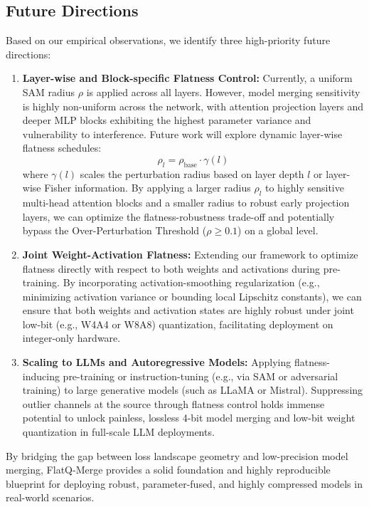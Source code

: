 \subsection{Future Directions}
Based on our empirical observations, we identify three high-priority future directions:
\begin{enumerate}
  \item \textbf{Layer-wise and Block-specific Flatness Control:} Currently, a uniform SAM radius $\rho$ is applied across all layers. However, model merging sensitivity is highly non-uniform across the network, with attention projection layers and deeper MLP blocks exhibiting the highest parameter variance and vulnerability to interference. Future work will explore dynamic layer-wise flatness schedules:
  \begin{equation}
    \rho_l = \rho_{\text{base}} \cdot \gamma(l)
  \end{equation}
  where $\gamma(l)$ scales the perturbation radius based on layer depth $l$ or layer-wise Fisher information. By applying a larger radius $\rho_l$ to highly sensitive multi-head attention blocks and a smaller radius to robust early projection layers, we can optimize the flatness-robustness trade-off and potentially bypass the Over-Perturbation Threshold ($\rho \ge 0.1$) on a global level.
  \item \textbf{Joint Weight-Activation Flatness:} Extending our framework to optimize flatness directly with respect to both weights and activations during pre-training. By incorporating activation-smoothing regularization (e.g., minimizing activation variance or bounding local Lipschitz constants), we can ensure that both weights and activation states are highly robust under joint low-bit (e.g., W4A4 or W8A8) quantization, facilitating deployment on integer-only hardware.
  \item \textbf{Scaling to LLMs and Autoregressive Models:} Applying flatness-inducing pre-training or instruction-tuning (e.g., via SAM or adversarial training) to large generative models (such as LLaMA or Mistral). Suppressing outlier channels at the source through flatness control holds immense potential to unlock painless, lossless 4-bit model merging and low-bit weight quantization in full-scale LLM deployments.
\end{enumerate}

By bridging the gap between loss landscape geometry and low-precision model merging, FlatQ-Merge provides a solid foundation and highly reproducible blueprint for deploying robust, parameter-fused, and highly compressed models in real-world scenarios.
